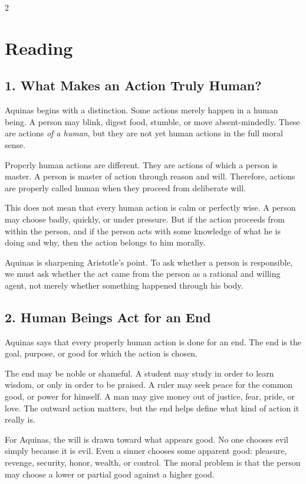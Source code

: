 \documentclass[12pt]{article}
\begin{document}
\begin{multicols}{2}
\section*{Reading}

\subsection*{1. What Makes an Action Truly Human?}
Aquinas begins with a distinction. Some actions merely happen in a human being. A person may blink, digest food, stumble, or move absent-mindedly. These are actions \textit{of a human}, but they are not yet human actions in the full moral sense.

Properly human actions are different. They are actions of which a person is master. A person is master of action through reason and will. Therefore, actions are properly called human when they proceed from deliberate will.

This does not mean that every human action is calm or perfectly wise. A person may choose badly, quickly, or under pressure. But if the action proceeds from within the person, and if the person acts with some knowledge of what he is doing and why, then the action belongs to him morally.

Aquinas is sharpening Aristotle's point. To ask whether a person is responsible, we must ask whether the act came from the person as a rational and willing agent, not merely whether something happened through his body.

\subsection*{2. Human Beings Act for an End}
Aquinas says that every properly human action is done for an end. The end is the goal, purpose, or good for which the action is chosen.

The end may be noble or shameful. A student may study in order to learn wisdom, or only in order to be praised. A ruler may seek peace for the common good, or power for himself. A man may give money out of justice, fear, pride, or love. The outward action matters, but the end helps define what kind of action it really is.

For Aquinas, the will is drawn toward what appears good. No one chooses evil simply because it is evil. Even a sinner chooses some apparent good: pleasure, revenge, security, honor, wealth, or control. The moral problem is that the person may choose a lower or partial good against a higher good.


\end{multicols}
\end{document}
